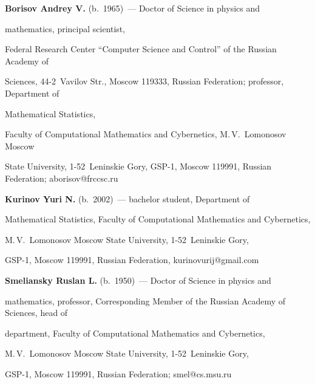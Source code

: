 \noindent


\textbf{Borisov Andrey V.} (b.\ 1965)~--- Doctor of Science in physics and 


mathematics, principal scientist, 


Federal Research Center ``Computer Science and Control'' of the Russian Academy of 


Sciences,  44-2~Vavilov Str., Moscow 119333, Russian Federation; professor, Department of 


Mathematical Statistics, 


Faculty of Computational Mathematics and Cybernetics, M.\,V.~Lomonosov Moscow 


State University, 1-52~Leninskie Gory,  GSP-1, Moscow 119991, Russian Federation; \mbox{aborisov@frccsc.ru}





\vspace*{3pt}





\noindent


\textbf{Kurinov Yuri N.} (b.\ 2002)~--- bachelor student, Department of 


Mathematical Statistics, Faculty of Computational Mathematics and Cybernetics, 


M.\,V.~Lomonosov Moscow State University, 1-52~Leninskie Gory,


GSP-1, Moscow 119991, Russian Federation, \mbox{kurinovurij@gmail.com}





\vspace*{3pt}





\noindent


\textbf{Smeliansky Ruslan L.} (b.\ 1950)~--- Doctor of Science in physics and 


mathematics, professor, Corresponding Member of the Russian Academy of Sciences, head of


department, Faculty of Computational Mathematics and Cybernetics, 


M.\,V.~Lomonosov Moscow State University, 1-52~Leninskie Gory,


GSP-1, Moscow 119991, Russian Federation; \mbox{smel@cs.msu.ru}








\label{end\stat}





\renewcommand{\bibname}{\protect\rm Литература} 


